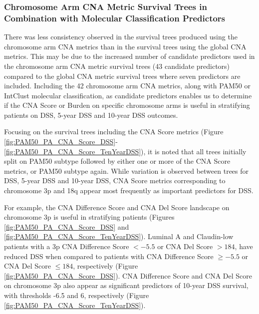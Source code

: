 \subsubsection{Chromosome Arm CNA Metric Survival Trees in Combination with Molecular Classification Predictors}
There was less consistency observed in the survival trees produced using the chromosome arm CNA metrics than in the survival trees using the global CNA metrics. This may be due to the increased number of candidate predictors used in the chromosome arm CNA metric survival trees (43 candidate predictors) compared to the global CNA metric survival trees where seven predictors are included. Including the 42 chromosome arm CNA metrics, along with PAM50 or IntClust molecular classification, as candidate predictors enables us to determine if the CNA Score or Burden on specific chromosome arms is useful in stratifying patients on DSS, 5-year DSS and 10-year DSS outcomes.  

Focusing on the survival trees including the CNA Score metrics (Figure \ref{fig:PAM50_PA_CNA_Score_DSS}-\ref{fig:PAM50_PA_CNA_Score_TenYearDSS}), it is noted that all trees initially split on PAM50 subtype followed by either one or more of the CNA Score metrics, or PAM50 subtype again. While variation is observed between trees for DSS, 5-year DSS and 10-year DSS, CNA Score metrics corresponding to chromosome 3p and 18q appear most frequently as important predictors for DSS. 

For example, the CNA Difference Score and CNA Del Score landscape on chromosome 3p is useful in stratifying patients (Figures \ref{fig:PAM50_PA_CNA_Score_DSS} and \ref{fig:PAM50_PA_CNA_Score_TenYearDSS}). Luminal A and Claudin-low patients with a 3p CNA Difference Score $<-5.5$ or CNA Del Score $>184$, have reduced DSS when compared to patients with CNA Difference Score $\geq -5.5$ or CNA Del Score $\leq 184$, respectively (Figure \ref{fig:PAM50_PA_CNA_Score_DSS}). CNA Difference Score and CNA Del Score on chromosome 3p also appear as significant predictors of 10-year DSS survival, with thresholds -6.5 and 6, respectively (Figure \ref{fig:PAM50_PA_CNA_Score_TenYearDSS}). 

